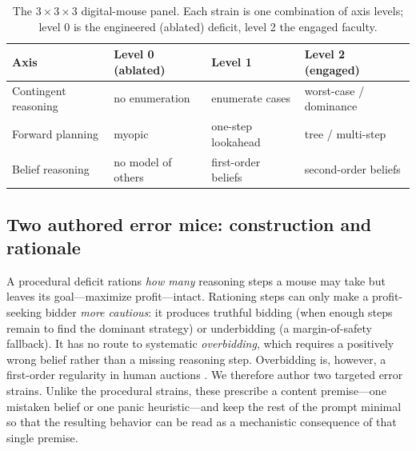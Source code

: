 \documentclass[12pt]{article}
\begin{document}
\begin{table}[t]
\centering
\caption{The $3\times 3\times 3$ digital-mouse panel. Each strain is
one combination of axis levels; level 0 is the engineered (ablated)
deficit, level 2 the engaged faculty.}
\label{tab:panel}
\small
\setlength{\tabcolsep}{5pt}
\begin{tabular}{@{}llll@{}}
\toprule
Axis & Level 0 (ablated) & Level 1 & Level 2 (engaged) \\
\midrule
Contingent reasoning & no enumeration & enumerate cases & worst-case / dominance \\
Forward planning     & myopic & one-step lookahead & tree / multi-step \\
Belief reasoning     & no model of others & first-order beliefs & second-order beliefs \\
\bottomrule
\end{tabular}
\end{table}

\subsection{Two authored error mice: construction and rationale}
\label{sec:errormice}

A procedural deficit rations \emph{how many} reasoning steps a mouse
may take but leaves its goal---maximize profit---intact. Rationing
steps can only make a profit-seeking bidder \emph{more cautious}: it
produces truthful bidding (when enough steps remain to find the
dominant strategy) or underbidding (a margin-of-safety fallback). It
has no route to systematic \emph{overbidding}, which requires a
positively wrong belief rather than a missing reasoning step.
Overbidding is, however, a first-order regularity in human auctions
\citep{kagellevin1993,crawfordiriberri2007}. We therefore author two
targeted error strains. Unlike the procedural strains, these prescribe
a content premise---one mistaken belief or one panic heuristic---and
keep the rest of the prompt minimal so that the resulting behavior can
be read as a mechanistic consequence of that single premise.
\end{document}
